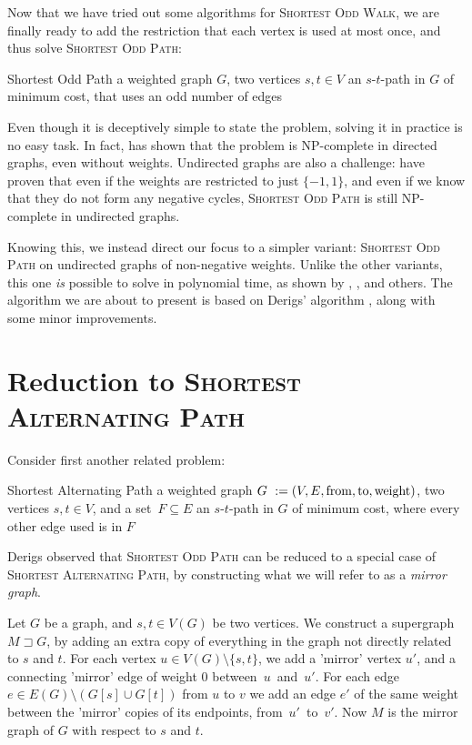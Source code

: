 Now that we have tried out some algorithms for \textsc{Shortest Odd Walk}, we are finally ready to add the restriction that each vertex is used at most once, and thus solve \textsc{Shortest Odd Path}:

\problem
{Shortest Odd Path}
{a weighted graph $G$, two vertices $s,t \in V$}
{an $s$-$t$-path in $G$ of minimum cost, that uses an odd number of edges}

Even though it is deceptively simple to state the problem, solving it in practice is no easy task. In fact, \cite{source:even-cycles-in-directed-graphs} has shown that the problem is NP-complete in directed graphs, even without weights. Undirected graphs are also a challenge: \cite{source:odd-paths-cycles-and-tjoins} have proven that even if the weights are restricted to just $\{-1,1\}$, and even if we know that they do not form any negative cycles, \textsc{Shortest Odd Path} is still NP-complete in undirected graphs. 

Knowing this, we instead direct our focus to a simpler variant: \textsc{Shortest Odd Path} on undirected graphs of non-negative weights. Unlike the other variants, this one \emph{is} possible to solve in polynomial time, as shown by \cite{source:even-cycles-in-directed-graphs}, \cite{source:odd-paths-cycles-and-tjoins}, \cite{source:derigs_shortest_odd_path} and others. The algorithm we are about to present is based on Derigs' algorithm \cite{source:derigs_shortest_odd_path}, along with some minor improvements.

\section{Reduction to \textsc{Shortest Alternating Path}}
\label{subsection:reduction}
Consider first another related problem:

\problem
{Shortest Alternating Path}
{a weighted graph $G~:= (V, E, \operatorname{from}, \operatorname{to}, \operatorname{weight})$, two vertices $s,t \in V$, and a set~$F \subseteq E$}
{an $s$-$t$-path in $G$ of minimum cost, where every other edge used is in $F$}

Derigs observed that \textsc{Shortest Odd Path} can be reduced to a special case of \textsc{Shortest Alternating Path}, by constructing what we will refer to as a \emph{mirror graph}.

\begin{definition}
    \label{def:mirror-graph}
    Let $G$ be a graph, and $s,t \in V(G)$ be two vertices. We construct a supergraph $M \sqsupset G$, by adding an extra copy of everything in the graph not directly related to $s$ and $t$. For each vertex $u \in V(G) \setminus \{s,t\}$, we add a 'mirror' vertex $u'$, and a connecting 'mirror' edge of weight 0 between~$u$~and~$u'$. For each edge $e \in E(G) \setminus (G[s] \cup G[t])$ from $u$ to $v$ we add an edge $e'$ of the same weight between the 'mirror' copies of its endpoints, from~$u'$~to~$v'$.
    Now $M$ is the mirror graph of $G$ with respect to $s$ and $t$.
\end{definition}

